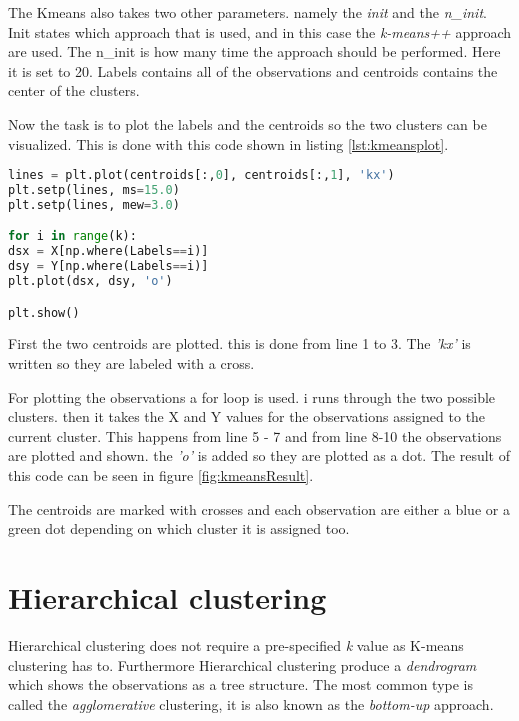 The Kmeans also takes two other parameters. namely the \emph{init} and the \emph{n\_init}. Init states which approach that is used, and in this case the \emph{k-means++} approach are used. The n\_init is how many time the approach should be performed. Here it is set to 20.
Labels contains all of the observations and centroids contains the center of the clusters.

Now the task is to plot the labels and the centroids so the two clusters can be visualized. 
This is done with this code shown in listing \ref{lst:kmeansplot}.

\begin{lstlisting}[language=Python, label=lst:kmeansplot, caption=The code for plotting the two clusters]
lines = plt.plot(centroids[:,0], centroids[:,1], 'kx')
plt.setp(lines, ms=15.0)
plt.setp(lines, mew=3.0)

for i in range(k):
dsx = X[np.where(Labels==i)]
dsy = Y[np.where(Labels==i)]
plt.plot(dsx, dsy, 'o')

plt.show()
\end{lstlisting}

First the two centroids are plotted. this is done from line 1 to 3. The \emph{'kx'} is written so they are labeled with a cross.

For plotting the observations a for loop is used. i runs through the two possible clusters. then it takes the X and Y values for the observations assigned to the current cluster. This happens from line 5 - 7 and from line 8-10 the observations are plotted and shown. the \emph{'o'} is added so they are plotted as a dot. 
The result of this code can be seen in figure \ref{fig:kmeansResult}.


The centroids are marked with crosses and each observation are either a blue or a green dot depending on which cluster it is assigned too.


\section{Hierarchical clustering}
Hierarchical clustering does not require a pre-specified \emph{k} value as K-means clustering has to.
Furthermore Hierarchical clustering produce a \emph{dendrogram} which shows the observations as a tree structure.
The most common type is called the \emph{agglomerative} clustering, it is also known as the \emph{bottom-up} approach.

